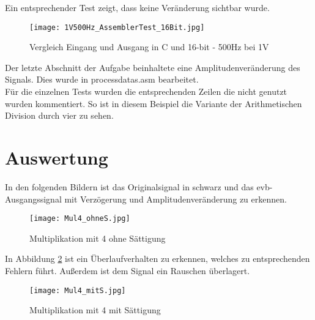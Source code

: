 Ein entsprechender Test zeigt, dass keine Veränderung sichtbar wurde.
\begin{figure}[h!]
  \centering
    \texttt{[image: 1V500Hz\_AssemblerTest\_16Bit.jpg]}
  \caption{Vergleich Eingang und Ausgang in C und 16-bit - 500Hz bei 1V}
  \label{fig:500HzC16}
\end{figure}
  
\pagebreak



Der letzte Abschnitt der Aufgabe beinhaltete eine Amplitudenver\"anderung des Signals. Dies wurde in process\textunderscore data\textunderscore s.asm 
bearbeitet.\\

Für die einzelnen Tests wurden die entsprechenden Zeilen die nicht genutzt wurden kommentiert. So ist in diesem Beispiel die Variante der Arithmetischen Division durch vier zu sehen.
\section{Auswertung}
In den folgenden Bildern ist das Originalsignal in schwarz und das \gls{evb}-Ausgangssignal mit Verzögerung und Amplitudenver\"anderung zu 
erkennen.\pagebreak

\begin{figure}[h!]
  \centering
    \texttt{[image: Mul4\_ohneS.jpg]}
  \caption{Multiplikation mit 4 ohne Sättigung}
  \label{fig:Mul4_ohneS}
\end{figure}
In Abbildung \ref{fig:Mul4_ohneS} ist ein \"Uberlaufverhalten zu erkennen, welches zu entsprechenden Fehlern führt. Außerdem ist dem Signal ein Rauschen 
überlagert.

\begin{figure}[h!]
  \centering
    \texttt{[image: Mul4\_mitS.jpg]}
  \caption{Multiplikation mit 4 mit Sättigung}
  \label{fig:Mul4_mitS}
\end{figure}

